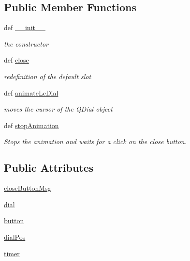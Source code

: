 \subsection*{\-Public \-Member \-Functions}
\begin{DoxyCompactItemize}
\item 
def \hyperlink{classuicilibris_1_1waitDialog_1_1spinWheelWaitDialog_a3467633739c1c42bc26866c8f5523a5e}{\-\_\-\-\_\-init\-\_\-\-\_\-}
\begin{DoxyCompactList}\small\item\em the constructor \end{DoxyCompactList}\item 
def \hyperlink{classuicilibris_1_1waitDialog_1_1spinWheelWaitDialog_addce2cc0b9b1edcfa82f37abf27fb5a7}{close}
\begin{DoxyCompactList}\small\item\em redefinition of the default slot \end{DoxyCompactList}\item 
def \hyperlink{classuicilibris_1_1waitDialog_1_1spinWheelWaitDialog_a8b457fed7f0d78457b08486746a8ea4b}{animate\-Lc\-Dial}
\begin{DoxyCompactList}\small\item\em moves the cursor of the \-Q\-Dial object \end{DoxyCompactList}\item 
def \hyperlink{classuicilibris_1_1waitDialog_1_1spinWheelWaitDialog_a833c2817deb73f7eee7cf3a1ec836cfb}{stop\-Animation}
\begin{DoxyCompactList}\small\item\em \-Stops the animation and waits for a click on the close button. \end{DoxyCompactList}\end{DoxyCompactItemize}
\subsection*{\-Public \-Attributes}
\begin{DoxyCompactItemize}
\item 
\hyperlink{classuicilibris_1_1waitDialog_1_1spinWheelWaitDialog_aac9bbd21ce4439a90b3307e167276849}{close\-Button\-Msg}
\item 
\hyperlink{classuicilibris_1_1waitDialog_1_1spinWheelWaitDialog_ac292d19bfaa5b744ff48951907ed3f12}{dial}
\item 
\hyperlink{classuicilibris_1_1waitDialog_1_1spinWheelWaitDialog_aabf2ac37ecd83ecdc2eaff46652d6ebc}{button}
\item 
\hyperlink{classuicilibris_1_1waitDialog_1_1spinWheelWaitDialog_a49c89cfb638907a01898a541a4d4cdea}{dial\-Pos}
\item 
\hyperlink{classuicilibris_1_1waitDialog_1_1spinWheelWaitDialog_a86ba95c8db0c48e34eaad4f6088fdcc3}{timer}
\end{DoxyCompactItemize}


